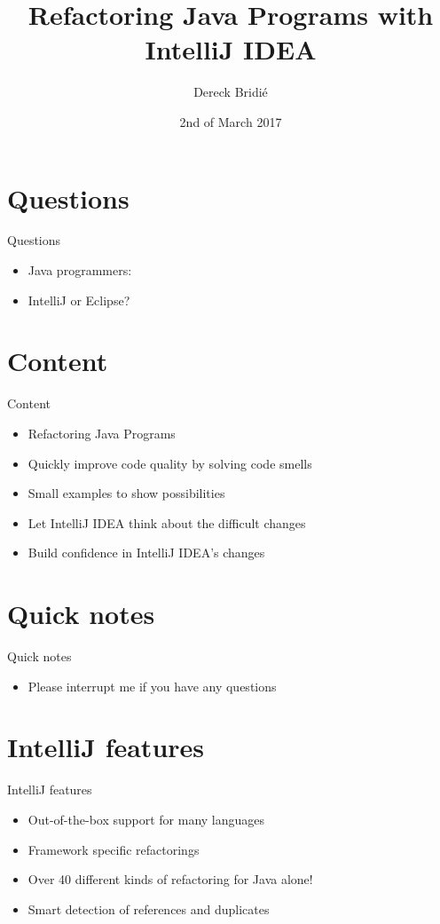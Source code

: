\documentclass{beamer}
\title{Refactoring Java Programs with IntelliJ IDEA}
\author{Dereck Bridi\'e}
\date{2nd of March 2017}
\begin{document}
\begin{frame}
\maketitle
\end{frame}

\section{Questions}
\begin{frame}{Questions}
\begin{itemize}
    \item Java programmers:
    \item IntelliJ or Eclipse?
\end{itemize}
\end{frame}

\section{Content}
\begin{frame}{Content}
\begin{itemize}
    \item Refactoring Java Programs
    \item Quickly improve code quality by solving code smells
    \item Small examples to show possibilities
    \item Let IntelliJ IDEA think about the difficult changes \pause
    \item Build confidence in IntelliJ IDEA's changes
\end{itemize}
\end{frame}

\section{Quick notes}
\begin{frame}{Quick notes}
\begin{itemize}
    \item Please interrupt me if you have any questions
\end{itemize}
\end{frame}

\section{IntelliJ features}
\begin{frame}{IntelliJ features}
\begin{itemize}
	\item Out-of-the-box support for many languages
	\item Framework specific refactorings
	\item Over 40 different kinds of refactoring for Java alone!
	\item Smart detection of references and duplicates	
\end{itemize}
\end{frame}
\end{document}
